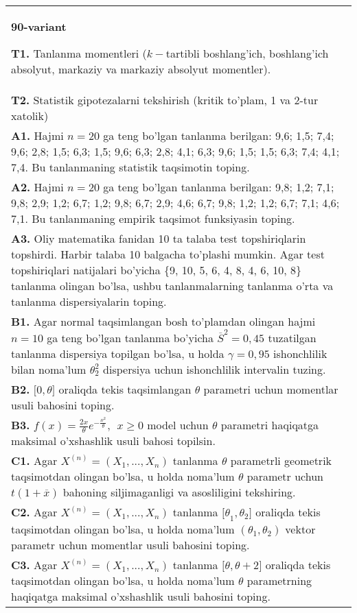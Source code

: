 \documentclass{article}
\begin{document}
\begin{tabular}{m{17cm}}
\textbf{90-variant}
\newline

\textbf{T1.} 
Tanlanma momentleri (\(k -\)tartibli boshlang'ich, boshlang'ich absolyut, markaziy va markaziy absolyut momentler).
\\
\textbf{T2.} 
Statistik gipotezalarni tekshirish (kritik to'plam, 1 va 2-tur xatolik)
\\
\textbf{A1.} 
Hajmi \(n = 20\) ga teng bo'lgan tanlanma berilgan: 9,6; 1,5; 7,4; 9,6; 2,8; 1,5; 6,3; 1,5; 9,6; 6,3; 2,8; 4,1; 6,3; 9,6; 1,5; 1,5; 6,3; 7,4; 4,1; 7,4. Bu tanlanmaning statistik taqsimotin toping.
\\
\textbf{A2.} 
Hajmi \(n = 20\) ga teng bo'lgan tanlanma berilgan: 9,8; 1,2; 7,1; 9,8; 2,9; 1,2; 6,7; 1,2; 9,8; 6,7; 2,9; 4,6; 6,7; 9,8; 1,2; 1,2; 6,7; 7,1; 4,6; 7,1. Bu tanlanmaning empirik taqsimot funksiyasin toping.
\\
\textbf{A3.} 
Oliy matematika fanidan 10 ta talaba test topshiriqlarin topshirdi. Harbir talaba 10 balgacha to'plashi mumkin. Agar test topshiriqlari natijalari bo'yicha \{9, 10, 5, 6, 4, 8, 4, 6, 10, 8\} tanlanma olingan bo'lsa, ushbu tanlanmalarning tanlanma o'rta va tanlanma dispersiyalarin toping.
\\
\textbf{B1.} 
Agar normal taqsimlangan bosh to'plamdan olingan hajmi \(n = 10\) ga teng bo'lgan tanlanma bo'yicha \({\overline{S}}^{2} = 0,45\) tuzatilgan tanlanma dispersiya topilgan bo'lsa, u holda \(\gamma = 0,95\) ishonchlilik bilan noma'lum \(\theta_{2}^{2}\) dispersiya uchun ishonchlilik intervalin tuzing.
\\
\textbf{B2.} 
\(\lbrack 0,\theta\rbrack\) oraliqda tekis taqsimlangan \(\theta\) parametri uchun momentlar usuli bahosini toping.
\\
\textbf{B3.} 
\(f(x) = \frac{2x}{\theta}e^{- \frac{x^{2}}{\theta}},\ \ x \geq 0\) model uchun \(\theta\) parametri haqiqatga maksimal o'xshashlik usuli bahosi topilsin.
\\
\textbf{C1.} 
Agar \(X^{(n)} = \left( X_{1},...,X_{n} \right)\) tanlanma \(\theta\) parametrli geometrik taqsimotdan olingan bo'lsa, u holda noma'lum \(\theta\) parametr uchun \(t(1 + \overline{x})\) bahoning siljimaganligi va asosliligini tekshiring.
\\
\textbf{C2.} 
Agar \(X^{(n)} = \left( X_{1},...,X_{n} \right)\) tanlanma \({\lbrack\theta}_{1},\theta_{2}\rbrack\) oraliqda tekis taqsimotdan olingan bo'lsa, u holda noma'lum \(\left( \theta_{1},\theta_{2} \right)\) vektor parametr uchun momentlar usuli bahosini toping.
\\
\textbf{C3.} 
Agar \(X^{(n)} = \left( X_{1},...,X_{n} \right)\) tanlanma \(\lbrack\theta,\theta + 2\rbrack\) oraliqda tekis taqsimotdan olingan bo'lsa, u holda noma'lum \(\theta\) parametrning haqiqatga maksimal o'xshashlik usuli bahosini toping.
\\

\end{tabular}
\vspace{1cm}
\end{document}

